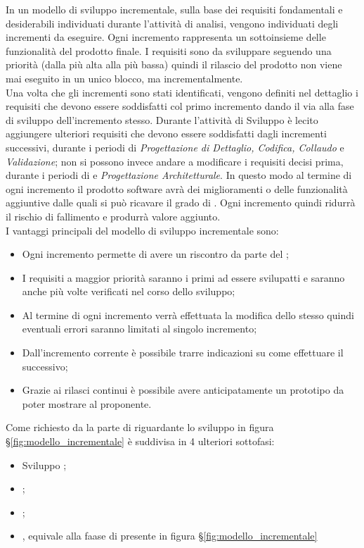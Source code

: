 In un modello di sviluppo incrementale, sulla base dei requisiti fondamentali e desiderabili individuati durante l'attività di analisi, vengono individuati degli incrementi da eseguire. Ogni incremento rappresenta un sottoinsieme delle funzionalità del prodotto finale. I requisiti sono da sviluppare seguendo una priorità (dalla più alta alla più bassa) quindi il rilascio del prodotto non viene mai eseguito in un unico blocco, ma incrementalmente.\\
Una volta che gli incrementi sono stati identificati, vengono definiti nel dettaglio i requisiti che devono essere soddisfatti col primo incremento dando il via alla fase di sviluppo dell’incremento stesso.  Durante l’attività di Sviluppo è lecito aggiungere ulteriori requisiti che devono essere soddisfatti dagli incrementi successivi, durante i periodi di \textit{Progettazione di Dettaglio, Codifica, Collaudo} e \textit{Validazione}; non si possono invece andare a modificare i requisiti decisi prima, durante i periodi di \textit{\AdR} e \textit{Progettazione Architetturale}. In questo modo al termine di ogni incremento il prodotto software avrà dei miglioramenti o delle funzionalità aggiuntive dalle quali si può ricavare il grado di . Ogni incremento quindi ridurrà il rischio di fallimento e produrrà valore aggiunto.\\
I vantaggi principali del modello di sviluppo incrementale sono:
\begin{itemize}
    \item Ogni incremento permette di avere un riscontro da parte del ;
    \item I requisiti a maggior priorità saranno i primi ad essere svilupatti e saranno anche più volte verificati nel corso dello sviluppo;
    \item Al termine di ogni incremento verrà effettuata la modifica dello stesso quindi eventuali errori saranno limitati al singolo incremento;
    \item Dall'incremento corrente è possibile trarre indicazioni su come effettuare il successivo;
    \item Grazie ai rilasci continui è possibile avere anticipatamente un prototipo da poter mostrare al proponente.
\end{itemize}

Come richiesto da \Proponente la parte di  riguardante lo sviluppo in figura \S\ref{fig:modello_incrementale} è suddivisa in 4 ulteriori sottofasi:
\begin{itemize}
    \item Sviluppo ;
    \item {};
    \item {};
    \item {} , equivale alla faase di  presente in figura \S\ref{fig:modello_incrementale}
\end{itemize}
